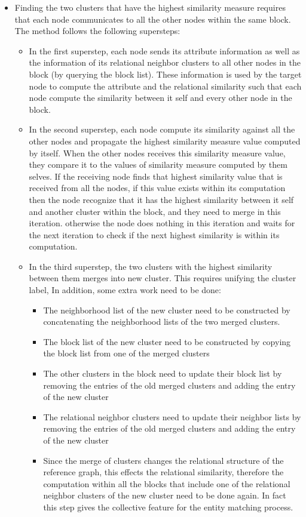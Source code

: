 \begin{itemize}
\item Finding the two clusters that have the highest similarity measure requires that each node communicates to all the other nodes within the same block. The method follows the following supersteps:
\begin{itemize}
\item In the first superstep, each node sends its attribute information as well as the information of its relational neighbor clusters to all other nodes in the block (by querying the block list). These information is used by the target node to compute the attribute and the relational similarity such that each node compute the similarity between it self and every other node in the block.
\item In the second superstep, each node compute its similarity against all the other nodes and propagate the highest similarity measure value computed by itself. When the other nodes receives this similarity measure value, they compare it to the values of similarity measure computed by them selves. If the receiving node finds that highest similarity value that is received from all the nodes, if this value exists within its computation then the node recognize that it has the highest similarity between it self and another cluster within the block, and they need to merge in this iteration. otherwise the node does nothing in this iteration and waits for the next iteration to check if the next highest similarity is within its computation.
\item In the third superstep, the two clusters with the highest similarity between them merges into new cluster. This requires unifying the cluster label, In addition, some extra work need to be done: 
\begin{itemize}
\item The neighborhood list of the new cluster need to be constructed by concatenating the neighborhood lists of the two merged clusters.

\item The block list of the new cluster need to be constructed by copying the block list from one of the merged clusters

\item The other clusters in the block need to update their block list by removing the entries of the old merged clusters and adding the entry of the new cluster

\item The relational neighbor clusters need to update their neighbor lists by removing the entries of the old merged clusters and adding the entry of the new cluster

\item Since the merge of clusters changes the relational structure of the reference graph, this effects the relational similarity, therefore the computation within all the blocks that include one of the relational neighbor clusters of the new cluster need to be done again. In fact this step gives the collective feature for the entity matching process. 
\end{itemize} 
\end{itemize}
\end{itemize}

